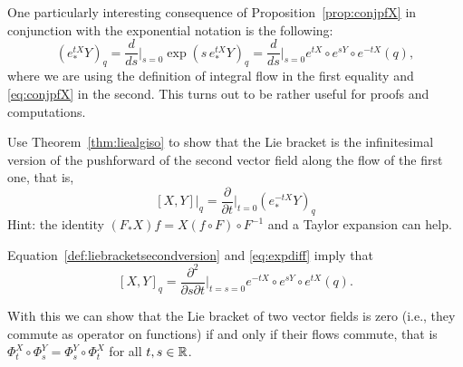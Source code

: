 \begin{remark}
  One particularly interesting consequence of Proposition~\ref{prop:conjpfX} in conjunction with the exponential notation is the following:
  \begin{equation}\label{eq:expdiff}
    \left(e_*^{tX} Y\right)_q =
    \frac{d}{ds}\Big|_{s=0} \exp\left(s\, e_*^{tX} Y\right)_q =
    \frac{d}{ds}\Big|_{s=0} e^{tX}\circ e^{sY}\circ e^{-t X}(q),
  \end{equation}
  where we are using the definition of integral flow in the first equality and \eqref{eq:conjpfX} in the second.
  This turns out to be rather useful for proofs and computations.  
\end{remark}

\begin{exercise}
  Use Theorem~\ref{thm:liealgiso} to show that the Lie bracket is the infinitesimal version of the pushforward of the second vector field along the flow of the first one, that is,
  \begin{equation}\label{def:liebracketsecondversion}
    [X,Y]\big|_q = \frac{\partial}{\partial t}\Big|_{t=0} (e_*^{-t X} Y)_q
  \end{equation}
  Hint: the identity $(F_* X)f = X(f\circ F)\circ F^{-1}$ and a Taylor expansion can help.
\end{exercise}

\begin{remark}
  Equation~\eqref{def:liebracketsecondversion} and \eqref{eq:expdiff} imply that
  \begin{equation}\label{eq:lbddr}
    [X,Y]_q = \frac{\partial^2}{\partial s \partial t}\Big|_{t=s=0}e^{-tX}\circ e^{sY}\circ e^{t X}(q).
  \end{equation}
\end{remark}

With this we can show that the Lie bracket of two vector fields is zero (i.e., they commute as operator on functions) if and only if their flows commute, that is $\Phi^X_t \circ \Phi^Y_s = \Phi^Y_s\circ \Phi^X_t$ for all $t,s\in\mathbb{R}$.

